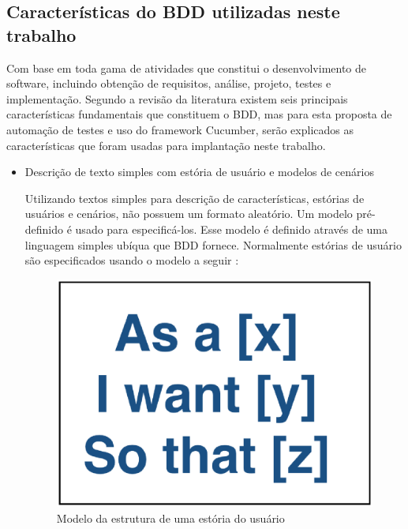 \subsection{Características do BDD utilizadas neste trabalho}

Com base em toda gama de atividades que constitui o desenvolvimento de software, incluindo obtenção de requisitos, análise, projeto, testes e implementação. Segundo a revisão da literatura \cite{Solis2011} existem seis principais características fundamentais que constituem o BDD, mas para esta proposta de automação de testes e uso do framework Cucumber, serão explicados as características que foram usadas para implantação neste trabalho.

\begin{itemize}

	\item Descrição de texto simples com estória de usuário e modelos de cenários
	
Utilizando textos simples para descrição de características,  estórias de usuários e cenários, não possuem um formato aleatório. Um modelo pré-definido é usado para especificá-los. Esse modelo é definido através de uma linguagem simples ubíqua que BDD fornece. Normalmente estórias de usuário são especificados usando o modelo a seguir \cite{bddIntroducing}:

\begin{figure}[H]
	\centering
	\captionsetup{justification=centering,margin=2cm}
	\includegraphics[scale=0.35]{capitulos/literatura/userStory.eps}
	\caption{Modelo da estrutura de uma estória do usuário}
	\label{fig:iceCreamConAntiPattern}
\end{figure}


\end{itemize}
